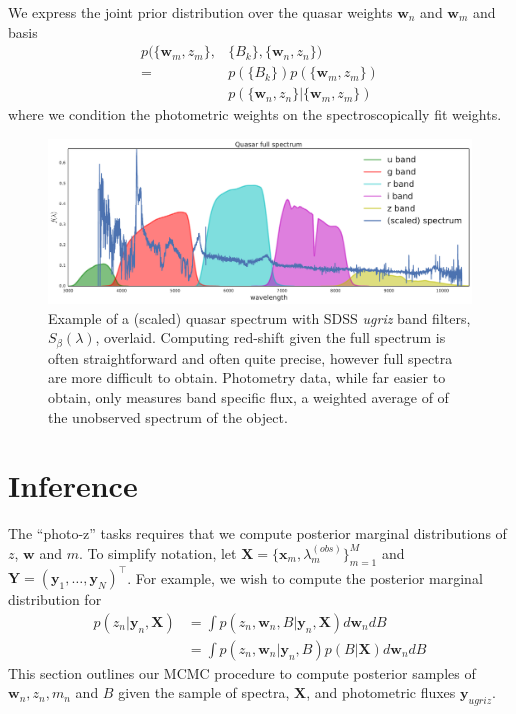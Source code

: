 \documentclass{article}
\newcommand{\trans}{\intercal}
\begin{document}
We express the joint prior distribution over the quasar weights $\mathbf{w}_n$ and $\mathbf{w}_m$ and basis 
\begin{align}
  p( \{ \mathbf{w}_m, z_m \}, &\{ B_k \}, \{ \mathbf{w}_n, z_n \} )  \\
    = & p(\{ B_k \}) p( \{ \mathbf{w}_m, z_m \} )  \\
      & p( \{ \mathbf{w}_n, z_n \} | \{ \mathbf{w}_m, z_m \} ) 
\end{align}
where we condition the photometric weights on the spectroscopically fit weights.  

\begin{figure}[ht]
\vskip 0.2in
\begin{center}
\centerline{\includegraphics[width=2\columnwidth]{../figs/quasar_spectrum_sdss_filters}}
\caption{Example of a (scaled) quasar spectrum with SDSS \emph{ugriz} band filters, $S_{\beta}(\lambda)$, overlaid.  Computing red-shift given the full spectrum is often straightforward and often quite precise, however full spectra are more difficult to obtain.  Photometry data, while far easier to obtain, only measures band specific flux, a weighted average of of the unobserved spectrum of the object. }
\label{fig:filters}
\end{center}
\vskip -0.2in
\end{figure} 

\section{Inference}
\label{sec:inference}
The ``photo-z'' tasks requires that we compute posterior marginal distributions of $z$, $\mathbf{w}$ and $m$.  To simplify notation, let $\mathbf{X} = \{\mathbf{x}_m, \lambda^{(obs)}_m \}_{m=1}^M$ and $\mathbf{Y} = ( \mathbf{y}_1, \dots, \mathbf{y}_N )^\trans$.   
For example, we wish to compute the posterior marginal distribution for
\begin{align}
  p(z_n | \mathbf{y}_n, \mathbf{X}) 
    &= \int p(z_n, \mathbf{w}_n, B | \mathbf{y}_n, \mathbf{X}) d\mathbf{w}_n dB \\
    &= \int p(z_n, \mathbf{w}_n | \mathbf{y}_n, B) p(B | \mathbf{X}) d\mathbf{w}_n dB
\end{align}
This section outlines our MCMC procedure to compute posterior samples of $\mathbf{w}_n, z_n, m_n$ and $B$ given the sample of spectra, $\mathbf{X}$, and photometric fluxes $\mathbf{y}_{ugriz}$.  
\end{document}
